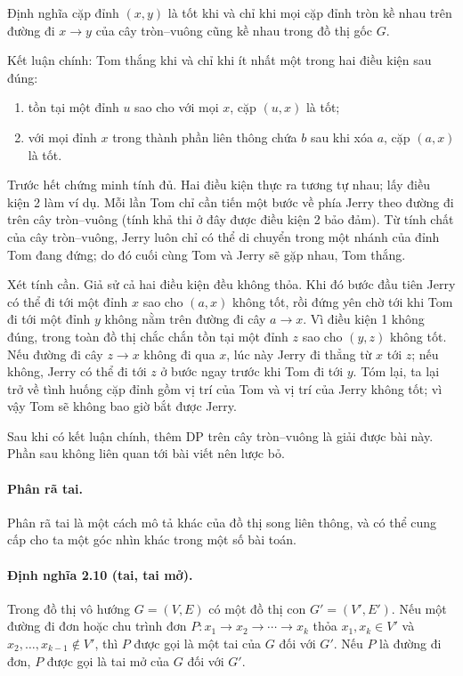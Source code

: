 \documentclass[11pt]{article}
\renewcommand{\leadsto}{\mathrel{\longrightarrow}}
\begin{document}
Định nghĩa cặp đỉnh $(x,y)$ là tốt khi và chỉ khi mọi cặp đỉnh tròn kề nhau trên
đường đi $x\leadsto y$ của cây tròn--vuông cũng kề nhau trong đồ thị gốc $G$.

Kết luận chính: Tom thắng khi và chỉ khi ít nhất một trong hai điều kiện sau
đúng:
\begin{enumerate}
  \item tồn tại một đỉnh $u$ sao cho với mọi $x$, cặp $(u,x)$ là tốt;
  \item với mọi đỉnh $x$ trong thành phần liên thông chứa $b$ sau khi xóa $a$,
  cặp $(a,x)$ là tốt.
\end{enumerate}

Trước hết chứng minh tính đủ. Hai điều kiện thực ra tương tự nhau; lấy điều kiện
2 làm ví dụ. Mỗi lần Tom chỉ cần tiến một bước về phía Jerry theo đường đi trên
cây tròn--vuông (tính khả thi ở đây được điều kiện 2 bảo đảm). Từ tính chất của
cây tròn--vuông, Jerry luôn chỉ có thể di chuyển trong một nhánh của đỉnh Tom
đang đứng; do đó cuối cùng Tom và Jerry sẽ gặp nhau, Tom thắng.

Xét tính cần. Giả sử cả hai điều kiện đều không thỏa. Khi đó bước đầu tiên Jerry
có thể đi tới một đỉnh $x$ sao cho $(a,x)$ không tốt, rồi đứng yên chờ tới khi
Tom đi tới một đỉnh $y$ không nằm trên đường đi cây $a\leadsto x$. Vì điều kiện
1 không đúng, trong toàn đồ thị chắc chắn tồn tại một đỉnh $z$ sao cho $(y,z)$
không tốt. Nếu đường đi cây $z\leadsto x$ không đi qua $x$, lúc này Jerry đi
thẳng từ $x$ tới $z$; nếu không, Jerry có thể đi tới $z$ ở bước ngay trước khi
Tom đi tới $y$. Tóm lại, ta lại trở về tình huống cặp đỉnh gồm vị trí của Tom và
vị trí của Jerry không tốt; vì vậy Tom sẽ không bao giờ bắt được Jerry.

Sau khi có kết luận chính, thêm DP trên cây tròn--vuông là giải được bài này.
Phần sau không liên quan tới bài viết nên lược bỏ.

\paragraph{Phân rã tai.}
Phân rã tai là một cách mô tả khác của đồ thị song liên thông, và có thể cung
cấp cho ta một góc nhìn khác trong một số bài toán.

\paragraph{Định nghĩa 2.10 (tai, tai mở).}
Trong đồ thị vô hướng $G=(V,E)$ có một đồ thị con $G'=(V',E')$. Nếu một đường
đi đơn hoặc chu trình đơn
$P:x_1\to x_2\to\cdots\to x_k$ thỏa
$x_1,x_k\in V'$ và $x_2,\ldots,x_{k-1}\notin V'$, thì $P$ được gọi là một tai
của $G$ đối với $G'$. Nếu $P$ là đường đi đơn, $P$ được gọi là tai mở của $G$
đối với $G'$.
\end{document}
